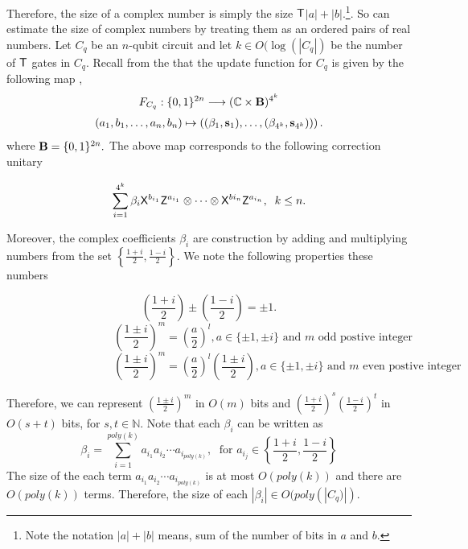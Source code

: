 Therefore, the size of a complex number is simply the size ${\sf T}$$|a|+|b|.$\footnote{Note the notation $|a|+|b|$ means, sum of the number of bits in $a$ and $b.$}. So can estimate the size of complex numbers by treating them as an ordered pairs of real numbers. Let $C_q$ be an $n$-qubit circuit and let $k\in O(\log(|C_q|)$ be the number of ${\sf T}$ gates in $C_q.$ Recall from the that the update function for $C_q$ is given by the following map ,
\begin{equation}
\begin{aligned}
 F_{C_q}: \{0,1\}^{2n}\longrightarrow  (\mathbb{C} \times {\bf B})^{4^k}
 \end{aligned}
\end{equation}
\begin{equation}
\begin{aligned}
 (a_1,b_1,\ldots, a_n,b_n) \mapsto \left((\beta_1, {\bf s}_1),\dots, (\beta_{4^k}, {\bf s}_{4^k}))\right).
\end{aligned}
\end{equation}      
where ${\bf B}=\{0,1\}^{2n}.$ The above map corresponds to the following correction unitary 

 \begin{equation*}
\sum_{i=1}^{4^k} \beta_i {\sf X}^{b_{i_1}} {\sf Z}^{a_{i_1}}\otimes \cdots \otimes {\sf X}^{b{i_n}} {\sf Z}^{a_{i_n}},\;  \; k\leq n.
\end{equation*}
 
Moreover, the complex coefficients $\beta_i$ are construction by adding and multiplying numbers from the set $\left\{\frac{1+i}{2},\frac{1-i}{2}\right\}.$ We note the following properties these numbers

 $$\left(\frac{1+i}{2}\right)\pm \left(\frac{1-i}{2}\right)=\pm1.$$
$$ \hspace{4cm}\left(\frac{1\pm i}{2}\right)^m=\left(\frac{a}{2}\right)^l, a\in\{\pm 1,\pm i\} \mbox{ and $m$ odd postive integer}$$
 $$\hspace{4cm}\left(\frac{1\pm i}{2}\right)^m=\left(\frac{a}{2}\right)^l \left(\frac{1\pm i}{2}\right), a\in\{\pm 1,\pm i\}\mbox{ and  $m$ even postive integer}$$
  
 

 Therefore, we can represent $\left(\frac{1\pm i}{2}\right)^m$ in $O(m)$ bits  and $\left(\frac{1+ i}{2}\right)^{s} \left(\frac{1- i}{2}\right)^{t}$ in $O(s+t)$ bits, for $s,t\in\mathbb{N}.$ 
 Note that each $\beta_i$ can be written as 
 $$\beta_i=\sum_{i=1}^{poly(k)}a_{i_1}a_{i_2}\cdots a_{i_{poly(k)}},\; \mbox{ for } a_{i_j}\in\left\{\frac{1+i}{2},\frac{1-i}{2}\right\}$$
The size of the each term $a_{i_1}a_{i_2}\cdots a_{i_{poly(k)}}$ is at most $O(poly(k))$ and there are $O(poly(k))$ terms. Therefore, the size of each $|\beta_i|\in O(poly(|C_q)|).$


